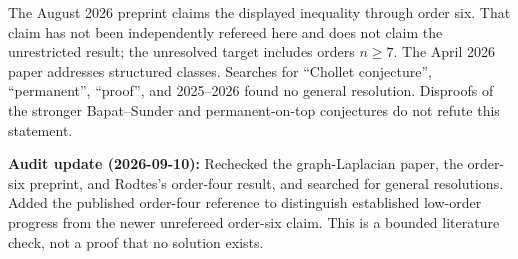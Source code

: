 \documentclass[11pt,a4paper]{article}
\begin{document}
The August 2026 preprint claims the displayed inequality through order
six. That claim has not been independently refereed here and does not
claim the unrestricted result; the unresolved target includes orders
\(n\ge7\). The April 2026 paper addresses structured classes. Searches
for ``Chollet conjecture'', ``permanent'', ``proof'', and 2025--2026
found no general resolution. Disproofs of the stronger Bapat--Sunder and
permanent-on-top conjectures do not refute this statement.

\textbf{Audit update (2026-09-10):} Rechecked the graph-Laplacian paper,
the order-six preprint, and Rodtes's order-four result, and searched for
general resolutions. Added the published order-four reference to
distinguish established low-order progress from the newer unrefereed
order-six claim. This is a bounded literature check, not a proof that no
solution exists.
\end{document}

